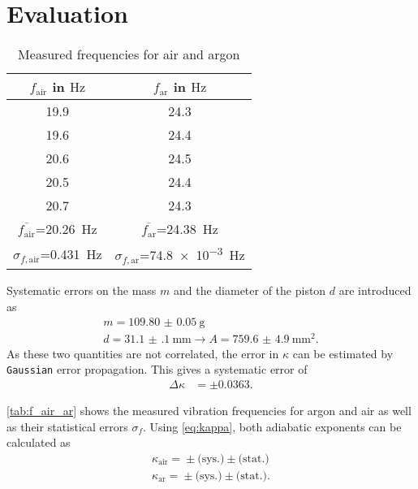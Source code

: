 \section{Evaluation}
\begin{table}[b!]
	\centering
	\caption{Measured frequencies for air and argon}
	\label{tab:f_air_ar}
	\begin{tabular}{SS}
		\toprule
		{$f_\text{air}$ in $\si{\hertz}$}	&	{{$f_\text{ar}$ in $\si{\hertz}$}}\\
		\midrule
		\num{19.9}	&	\num{24.3}	\\
		\num{19.6}	&	\num{24.4}	\\
		\num{20.6}	&	\num{24.5}	\\
		\num{20.5}	&	\num{24.4}	\\
		\num{20.7}	&	\num{24.3}	\\
		\midrule
		{$\overline{f_\text{air}}$=\SI{20.26}{\hertz}}	&	{$\overline{f_\text{ar}}$=\SI{24.38}{\hertz}}	\\
		{$\sigma_{f,\text{air}}$=\SI{0.431}{\hertz}}	&	{$\sigma_{f,\text{ar}}$=\SI{74.8e-3}{\hertz}}	\\
		\bottomrule
	\end{tabular}
\end{table}

Systematic errors on the mass $m$ and the diameter of the piston $d$ are introduced as
\begin{gather*}
	m=\SI{109.80(5)}{\gram} \\
	d=\SI{31.1(1)}{\milli\meter}\rightarrow A=\SI{759.6(49)}{\milli\meter\squared}.
\end{gather*}
As these two quantities are not correlated, the error in $\kappa$ can be estimated by \texttt{Gaussian} error propagation.
This gives a systematic error of
\begin{align}
	\Delta\kappa&=\pm\num{0.0363}.
\end{align}

\autoref{tab:f_air_ar} shows the measured vibration frequencies for argon and air as well as their statistical errors $\sigma_f$.
Using \autoref{eq:kappa}, both adiabatic exponents can be calculated as
\begin{gather*}
	\kappa_\text{air}=\num{}\pm\num{}\text{(sys.)}\pm\num{}\text{(stat.)} \\
	\kappa_\text{ar}=\num{}\pm\num{}\text{(sys.)}\pm\num{}\text{(stat.)}.
\end{gather*}
